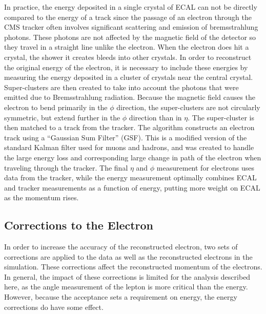 In practice, the energy deposited in a single crystal of ECAL can not be directly compared to the energy of a track since the passage of an electron through the CMS tracker often involves significant scattering and emission of bremsstrahlung photons. These photons are not affected by the magnetic field of the detector so they travel in a straight line unlike the electron. When the electron does hit a crystal, the shower it creates bleeds into other crystals. In order to reconstruct the original energy of the electron, it is necessary to include these energies by measuring the energy deposited in a cluster of crystals near the central crystal. Super-clusters are then created to take into account the photons that were emitted due to Bremsstrahlung radiation. Because the magnetic field causes the electron to bend primarily in the  $\phi$ direction, the super-clusters are not circularly symmetric, but extend further in the $\phi$ direction than in $\eta$. The super-cluster is then matched to a track from the tracker. The algorithm constructs an electron track using a “Gaussian Sum Filter” (GSF)\cite{adam_2005}. This is a modified version of the standard Kalman filter used for muons and hadrons, and was created to handle the large energy loss and corresponding large change in path of the electron when traveling through the tracker. The final $\eta$ and $\phi$ measurement for electrons uses data from the tracker, while the energy measurement optimally combines ECAL and tracker measurements as a function of energy, putting more weight on ECAL as the momentum rises.
 \subsection{Corrections to the Electron}
 In order to increase the accuracy of the reconstructed electron, two sets of corrections are applied to the data as well as the reconstructed electrons in the simulation. These corrections affect the reconstructed momentum of the electrons. In general, the impact of these corrections is limited for the analysis described here, as the angle measurement of the lepton is more critical than the energy. However, because the acceptance sets a requirement on energy, the energy corrections do have some effect. 
